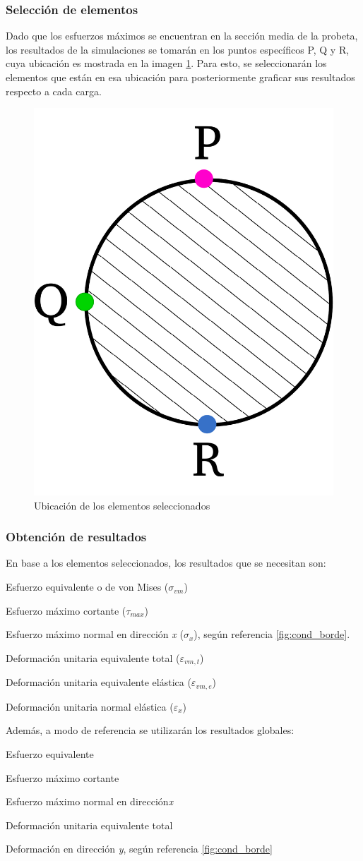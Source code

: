 \subsubsection{Selección de elementos}
Dado que los esfuerzos máximos se encuentran en la sección media de la probeta, los resultados de la simulaciones se tomarán en los puntos específicos P, Q y R, cuya ubicación es mostrada en la imagen \ref{fig:diag_pqr}. Para esto, se seleccionarán los elementos que están en esa ubicación para posteriormente graficar sus resultados respecto a cada carga.

\begin{figure}[h]
\centering
\includegraphics[width=0.3\linewidth]{Imagenes/diagelem_pqr.pdf}
\caption{Ubicación de los elementos seleccionados}
\label{fig:diag_pqr}
\end{figure}

\subsubsection{Obtención de resultados}
En base a los elementos seleccionados, los resultados que se necesitan son:
\begin{itemize*}
	\item Esfuerzo equivalente o de von Mises ($\sigma_{vm}$)
	\item Esfuerzo máximo cortante ($\tau_{max}$)
	\item Esfuerzo máximo normal en dirección \textit{x} ($\sigma_{x}$), según referencia \ref{fig:cond_borde}.
	\item Deformación unitaria equivalente total ($\varepsilon_{vm,t}$)
	\item Deformación unitaria equivalente elástica ($\varepsilon_{vm,e}$)
	\item Deformación unitaria normal elástica ($\varepsilon_{x}$)
\end{itemize*}

Además, a modo de referencia se utilizarán los resultados globales:
\begin{itemize*}
	\item Esfuerzo equivalente
	\item Esfuerzo máximo cortante
	\item Esfuerzo máximo normal en dirección\textit{x}
	\item Deformación unitaria equivalente total
	\item Deformación en dirección \textit{y}, según referencia \ref{fig:cond_borde}
\end{itemize*}
